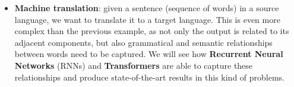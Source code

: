 \begin{itemize}
\begin{itemize}
        \textbf{Neural Networks} show their real power in this kind of problems,
        as they are able to learn features directly from the data, without any human intervention.
        
        \item \textbf{Machine translation}: given a sentence (sequence of words) in a source language, we want to translate it
        to a target language. This is even more complex than the previous example, as not only the output is related to its adjacent components,
        but also grammatical and semantic relationships between words need to be captured. We will see how \textbf{Recurrent Neural Networks} (RNNs) and \textbf{Transformers} are able 
        to capture these relationships and produce state-of-the-art results in this kind of problems.
    \end{itemize}
\end{itemize}

